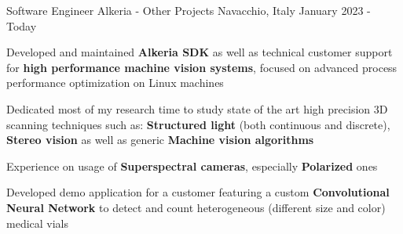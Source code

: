 \begin{cventries}

  \cventry
    {Software Engineer} %
    {Alkeria - Other Projects} %
    {Navacchio, Italy} %
    {January 2023 - Today} %
    {
      \begin{cvitems} %
        \item {Developed and maintained \textbf{Alkeria SDK} as well as technical customer support for \textbf{high performance machine vision systems}, focused on advanced process performance optimization on Linux machines}
        \item {Dedicated most of my research time to study state of the art high precision 3D scanning techniques such as: \textbf{Structured light} (both continuous and discrete), \textbf{Stereo vision}
        as well as generic \textbf{Machine vision algorithms}}
        \item {Experience on usage of \textbf{Superspectral cameras}, especially \textbf{Polarized} ones}
        \item {Developed demo application for a customer featuring a custom \textbf{Convolutional Neural Network} to detect and count
        heterogeneous (different size and color) medical vials}
      \end{cvitems}
    }


\end{cventries}
